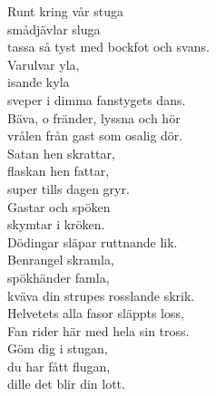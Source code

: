 \documentclass[a6paper, 10pt, twoside]{article}
\begin{document}
\begin{center}
\end{center}
\begin{lyrics}
\small Runt kring vår stuga\\ 
smådjävlar sluga\\ 
tassa så tyst med bockfot och svans.\\ 
Varulvar yla,\\ 
isande kyla\\ 
sveper i dimma fanstygets dans.
\vspace{5pt}\\ 
Bäva, o fränder, lyssna och hör\\ 
vrålen från gast som osalig dör.\\ 
Satan hen skrattar,\\ 
flaskan hen fattar,\\ 
super tills dagen gryr.
\vspace{5pt}\\ 
Gastar och spöken\\ 
skymtar i kröken.\\ 
Dödingar släpar ruttnande lik.\\ 
Benrangel skramla,\\ 
spökhänder famla,\\ 
kväva din strupes rosslande skrik.
\vspace{5pt}\\ 
Helvetets alla fasor släppts loss,\\ 
Fan rider här med hela sin tross.\\ 
Göm dig i stugan,\\ 
du har fått flugan,\\ 
dille det blir din lott.\\
\end{lyrics}
\end{document}

